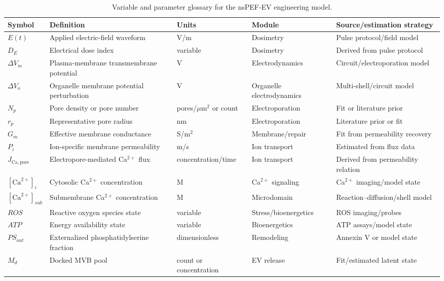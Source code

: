 \begin{table}[t]
\footnotesize\sf
\centering
\caption{Variable and parameter glossary for the nsPEF-EV engineering model.\label{T_A17_glossary}}
\begin{tabular}{p{2.5cm} p{5.0cm} p{2.1cm} p{2.7cm} p{3.2cm}}
\toprule
\textbf{Symbol} & \textbf{Definition} & \textbf{Units} & \textbf{Module} & \textbf{Source/estimation strategy} \\
\midrule
$E(t)$ & Applied electric-field waveform & V/m & Dosimetry & Pulse protocol/field model \\
$D_E$ & Electrical dose index & variable & Dosimetry & Derived from pulse protocol \\
$\Delta V_m$ & Plasma-membrane transmembrane potential & V & Electrodynamics & Circuit/electroporation model \\
$\Delta V_o$ & Organelle membrane potential perturbation & V & Organelle electrodynamics & Multi-shell/circuit model \\
$N_p$ & Pore density or pore number & pores/$\mu$m$^2$ or count & Electroporation & Fit or literature prior \\
$r_p$ & Representative pore radius & nm & Electroporation & Literature prior or fit \\
$G_m$ & Effective membrane conductance & S/m$^2$ & Membrane/repair & Fit from permeability recovery \\
$P_i$ & Ion-specific membrane permeability & m/s & Ion transport & Estimated from flux data \\
$J_{\mathrm{Ca,pore}}$ & Electropore-mediated Ca$^{2+}$ flux & concentration/time & Ion transport & Derived from permeability relation \\
$[\mathrm{Ca}^{2+}]_i$ & Cytosolic Ca$^{2+}$ concentration & M & Ca$^{2+}$ signaling & Ca$^{2+}$ imaging/model state \\
$[\mathrm{Ca}^{2+}]_{sub}$ & Submembrane Ca$^{2+}$ concentration & M & Microdomain & Reaction--diffusion/shell model \\
$ROS$ & Reactive oxygen species state & variable & Stress/bioenergetics & ROS imaging/probes \\
$ATP$ & Energy availability state & variable & Bioenergetics & ATP assays/model state \\
$PS_{out}$ & Externalized phosphatidylserine fraction & dimensionless & Remodeling & Annexin V or model state \\
$M_d$ & Docked MVB pool & count or concentration & EV release & Fit/estimated latent state \\

\end{tabular}
\end{table}
